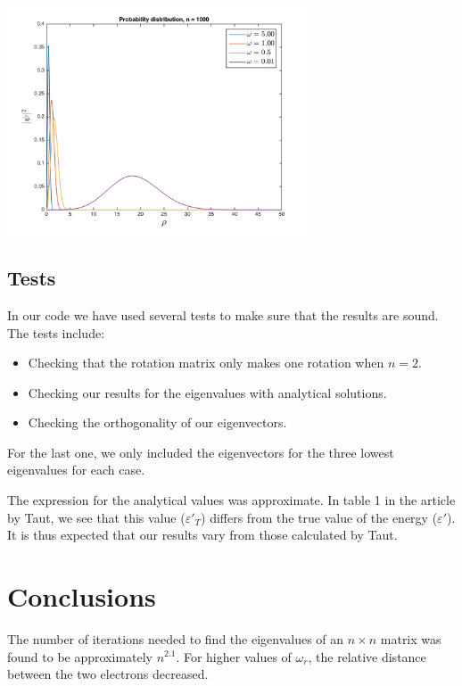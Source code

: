 \documentclass{article}
\begin{document}
\begin{multicols}{2}
\begin{center}
	\includegraphics[width=90mm]{../build-Project2-Desktop_Qt_5_5_0_clang_64bit-Debug/probability_distribution.png} 	
	\label{fig:prob_dist}
\end{center}


\subsection{Tests}
In our code we have used several tests to make sure that the results are sound. The tests include:

\begin{itemize}
	\item Checking that the rotation matrix only makes one rotation when $n = 2$.
	\item Checking our results for the eigenvalues with analytical solutions.
	\item Checking the orthogonality of our eigenvectors.
\end{itemize}
For the last one, we only included the eigenvectors for the three lowest eigenvalues for each case.

The expression for the analytical values was approximate. In table 1 in the article by Taut, we see that this value ($\varepsilon'_T$) differs from the true value of the energy ($\varepsilon'$). It is thus expected that our results vary from those calculated by Taut.




\section{Conclusions}
The number of iterations needed to find the eigenvalues of an $n\times n$ matrix was found to be approximately $n^{2.1}$.
For higher values of $\omega_r$, the relative distance between the two electrons decreased.






\end{multicols}
\end{document}
